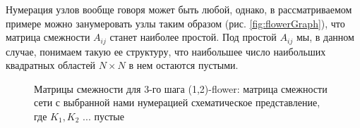\documentclass[10pt,aps,pra]{revtex4-1}
\begin{document}
        Нумерация узлов вообще говоря может быть любой, однако, в рассматриваемом примере можно занумеровать узлы таким образом (рис. \ref{fig:flowerGraph}), что матрица смежности $A_{ij}$ станет наиболее простой. Под простой $A_{ij}$ мы, в данном случае, понимаем такую ее структуру, что наибольшее число наибольших квадратных областей $N \times N$ в нем остаются пустыми.

            \begin{figure}[H]  
                \centering

                \caption{
                    \label{fig:flowerMatrix}
                    Матрицы смежности для 3-го шага (1,2)-flower:
                      матрица смежности сети с выбранной нами нумерацией
                     схематическое представление, где $K_1, K_2$ ... пустые
                }
            \end{figure}
\end{document}

